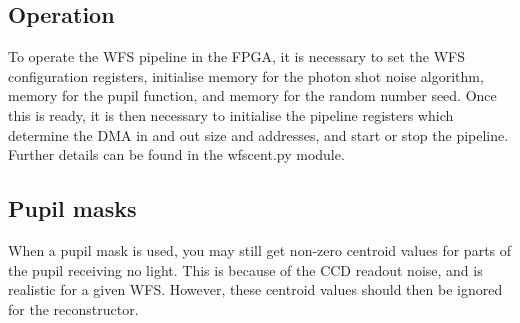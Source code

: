 \documentclass{article}
\begin{document}
\subsection{Operation}
To operate the WFS pipeline in the FPGA, it is necessary to set the
WFS configuration registers, initialise memory for the photon shot
noise algorithm, memory for the pupil function, and memory for the
random number seed.  Once this is ready, it is then necessary to
initialise the pipeline registers which determine the DMA in and out
size and addresses, and start or stop the pipeline.  Further details
can be found in the wfscent.py module.

\subsection{Pupil masks}
When a pupil mask is used, you may still get non-zero centroid values
for parts of the pupil receiving no light.  This is because of the CCD
readout noise, and is realistic for a given WFS.  However, these
centroid values should then be ignored for the reconstructor.

\pagebreak



\printindex
\end{document}
